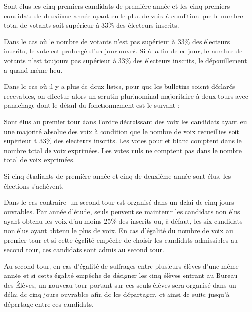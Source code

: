 \documentclass{article}
\begin{document}
				\begin{adjustwidth}{1cm}{}
					Sont élus les cinq premiers candidats de première année et
					les cinq premiers candidats de deuxième année ayant eu le
					plus de voix à condition que le nombre total de votants soit
					supérieur à 33\% des électeurs inscrits.

					Dans le cas où le nombre de votants n’est pas supérieur à
					33\% des électeurs inscrits, le vote est prolongé d’un jour
					ouvré. Si à la fin de ce jour, le nombre de votants n’est
					toujours pas supérieur à 33\% des électeurs inscrits, le
					dépouillement a quand même lieu.
				\end{adjustwidth}

				Dans le cas où il y a plus de deux listes, pour que les
				bulletins soient déclarés recevables, on effectue alors un
				scrutin plurinominal majoritaire à deux tours avec panachage
				dont le détail du fonctionnement est le suivant :

				\begin{adjustwidth}{1cm}{}
				Sont élus au premier tour dans l’ordre décroissant des voix les
					candidats ayant eu une majorité absolue des voix à condition
					que le nombre de voix recueillies soit supérieur à 33\% des
					électeurs inscrits. Les votes pour et blanc comptent dans le
					nombre total de voix exprimées. Les votes nuls ne comptent
					pas dans le nombre total de voix exprimées.

					Si cinq étudiants de première année et cinq de deuxième
					année sont élus, les élections s’achèvent.
				
					Dans le cas contraire, un second tour est organisé dans un
					délai de cinq jours ouvrables. Par année d’étude, seuls
					peuvent se maintenir les candidats non élus ayant obtenu les
					voix d’au moins 25\% des inscrits ou, à défaut, les six
					candidats non élus ayant obtenu le plus de voix. En cas
					d’égalité du nombre de voix au premier tour et si cette
					égalité empêche de choisir les candidats admissibles au
					second tour, ces candidats sont admis au second tour.

					Au second tour, en cas d'égalité de suffrages entre
					plusieurs élèves d'une même année et si cette égalité
					empêche de désigner les cinq élèves entrant au Bureau des
					Élèves, un nouveau tour portant sur ces seuls élèves sera
					organisé dans un délai de cinq jours ouvrables afin de les
					départager, et ainsi de suite jusqu’à départage entre ces
					candidats.
				\end{adjustwidth}
\end{document}
